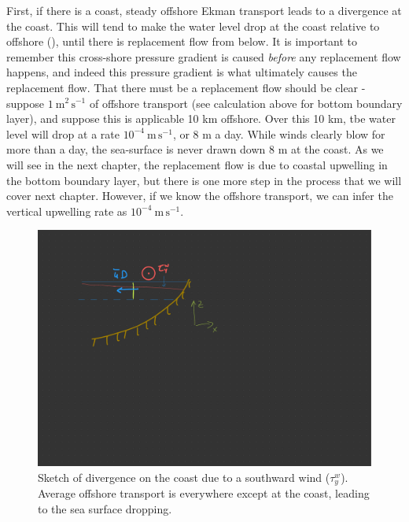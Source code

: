 First, if there is a coast, steady offshore Ekman transport leads to a divergence at the coast.  This will tend to make the water level drop at the coast relative to offshore (), until there is  replacement flow from below. It is important to remember this cross-shore pressure gradient is caused \emph{before} any replacement flow happens, and indeed this pressure gradient is what ultimately causes the replacement flow.  That there must be a replacement flow should be clear - suppose $1\ \mathrm{m^2\,s^{-1}}$ of offshore transport (see calculation above for bottom boundary layer), and suppose this is applicable 10 km offshore.  Over this 10 km, tbe water level will drop at a rate $10^{-4}\ \mathrm{m\,s^{-1}}$, or 8 m a day.  While winds clearly blow for more than a day, the sea-surface is never drawn down 8 m at the coast.  As we will see in the next chapter, the replacement flow is due to coastal upwelling in the bottom boundary layer, but there is one more step in the process that we will cover next chapter.  However, if we know the offshore transport, we can infer the vertical upwelling rate as $10^{-4}\ \mathrm{m\,s^{-1}}$.

\begin{figure}[hbt]
  \begin{center}
  \includegraphics{figs/Coriolis/EkmanDivCoast}
    \caption{Sketch of divergence on the coast due to a southward wind ($\tau_y^w$).  Average offshore transport is everywhere except at the coast, leading to the sea surface dropping. }
    \label{fig:EkmanDivCoast}  
  \end{center}
\end{figure}

